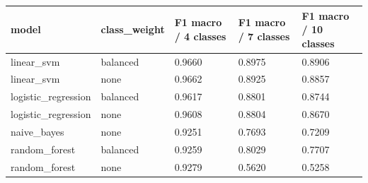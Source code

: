 \begin{tabular}{lllll}
\hline
model & class\_weight & F1 macro / 4 classes & F1 macro / 7 classes & F1 macro / 10 classes \\
\hline
linear\_svm & balanced & 0.9660 & 0.8975 & 0.8906 \\
linear\_svm & none & 0.9662 & 0.8925 & 0.8857 \\
logistic\_regression & balanced & 0.9617 & 0.8801 & 0.8744 \\
logistic\_regression & none & 0.9608 & 0.8804 & 0.8670 \\
naive\_bayes & none & 0.9251 & 0.7693 & 0.7209 \\
random\_forest & balanced & 0.9259 & 0.8029 & 0.7707 \\
random\_forest & none & 0.9279 & 0.5620 & 0.5258 \\
\hline
\end{tabular}

